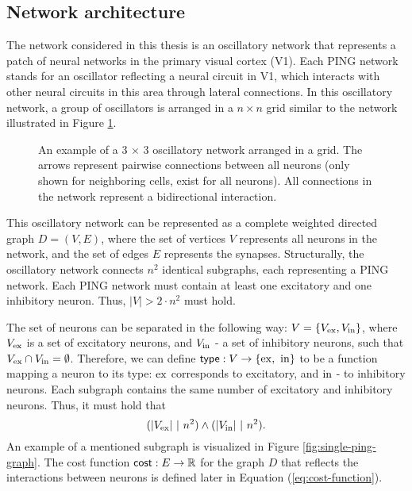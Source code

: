 \subsection{Network architecture}
\label{sec:grid-network}

The network considered in this thesis is an oscillatory network that represents a patch of neural networks in the primary visual cortex (V1). Each PING network stands for an oscillator reflecting a neural circuit in V1, which interacts with other neural circuits in this area through lateral connections.
In this oscillatory network, a group of oscillators is arranged in a $n \times n$ grid similar to the network illustrated in Figure \ref{fig:oscillatory-grid-graph}.

\begin{figure}[!htp]
    \centering
    
    \caption[Grid oscillatory network]{An example of a 3 $\times$ 3 oscillatory network arranged in a grid. The arrows represent pairwise connections between all neurons (only shown for neighboring cells, exist for all neurons). All connections in the network represent a bidirectional interaction.}
    \label{fig:oscillatory-grid-graph}
\end{figure}

This oscillatory network can be represented as a complete weighted directed graph $D = (V, E)$, where the set of vertices $V$ represents all neurons in the network, and the set of edges $E$ represents the synapses. Structurally, the oscillatory network connects $n^2$ identical subgraphs, each representing a PING network. Each PING network must contain at least one excitatory and one inhibitory neuron. Thus, $|V| > 2 \cdot n^2$ must hold.

The set of neurons can be separated in the following way: $V = \{ V_{\mathrm{ex}}, V_{\mathrm{in}}\}$, where $V_{\mathrm{ex}}$ is a set of excitatory neurons, and $V_{\mathrm{in}}$ - a set of inhibitory neurons, such that $V_{\mathrm{ex}} \cap V_{\mathrm{in}} = \emptyset$.
Therefore, we can define $\mathsf{type}: V \to \{ \mathrm{ex}, \ \mathrm{in} \}$ to be a function mapping a neuron to its type: $\mathrm{ex}$ corresponds to excitatory, and $\mathrm{in}$ - to inhibitory neurons. Each subgraph contains the same number of excitatory and inhibitory neurons. Thus, it must hold that
\begin{equation}
    (|V_{\mathrm{ex}}| \ | \ n^2) \land (|V_{\mathrm{in}}| \ | \ n^2).
\end{equation}
An example of a mentioned subgraph is visualized in Figure \ref{fig:single-ping-graph}. 
The cost function $\mathsf{cost}: E \to \mathbb{R}$ for the graph $D$ that reflects the interactions between neurons is defined later in Equation (\ref{eq:cost-function}).


